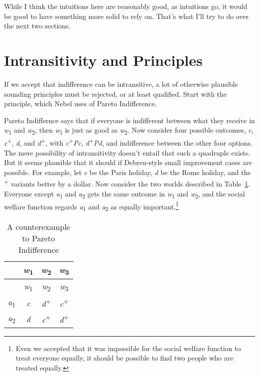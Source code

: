 \documentclass[
  11pt,
  letterpaper,
  DIV=11,
  numbers=noendperiod,
  twoside]{scrartcl}
\begin{document}
While I think the intuitions here are reasonably good, as intuitions go,
it would be good to have something more solid to rely on. That's what
I'll try to do over the next two sections.

\section{Intransitivity and Principles}\label{sec-iandt}

If we accept that indifference can be intransitive, a lot of otherwise
plausible sounding principles must be rejected, or at least qualified.
Start with the principle, which Nebel uses of Pareto Indifference.

Pareto Indiffernce says that if everyone is indifferent between what
they receive in \emph{w}\textsubscript{1} and \emph{w}\textsubscript{2},
then \emph{w}\textsubscript{1} is just as good as
\emph{w}\textsubscript{2}. Now consider four possible outcomes,
\emph{c}, \emph{c}\textsuperscript{+}, \emph{d}, and
\emph{d}\textsuperscript{+}, with \emph{c}\textsuperscript{+}\emph{Pc},
\emph{d}\textsuperscript{+}\emph{Pd}, and indifference between the other
four options. The mere possibility of intransitivity doesn't entail that
such a quadruple exists. But it seems plausible that it should if
Debreu-style small improvement cases are possible. For example, let
\emph{c} be the Paris holiday, \emph{d} be the Rome holiday, and the
\textsuperscript{+} variants better by a dollar. Now consider the two
worlds described in Table~\ref{tbl-pareto-indifference}. Everyone except
\emph{a}\textsubscript{1} and \emph{a}\textsubscript{2} gets the same
outcome in \emph{w}\textsubscript{1} and \emph{w}\textsubscript{2}, and
the social welfare function regards \emph{a}\textsubscript{1} and
\emph{a}\textsubscript{2} as equally important.\footnote{Even we
  accepted that it was impossible for the social welfare function to
  treat everyone equally, it should be possible to find two people who
  are treated equally.}

\begin{longtable}[]{@{}cccc@{}}
\caption{A counterexample to Pareto
Indifference}\label{tbl-pareto-indifference}\tabularnewline
\toprule\noalign{}
& \emph{w}\textsubscript{1} & \emph{w}\textsubscript{2} &
\emph{w}\textsubscript{3} \\
\midrule\noalign{}
\endfirsthead
\toprule\noalign{}
& \emph{w}\textsubscript{1} & \emph{w}\textsubscript{2} &
\emph{w}\textsubscript{3} \\
\midrule\noalign{}
\endhead
\bottomrule\noalign{}
\endlastfoot
\emph{a}\textsubscript{1} & \emph{c} & \emph{d}\textsuperscript{+} &
\emph{c}\textsuperscript{+} \\
\emph{a}\textsubscript{2} & \emph{d} & \emph{c}\textsuperscript{+} &
\emph{d}\textsuperscript{+} \\
\end{longtable}
\end{document}

